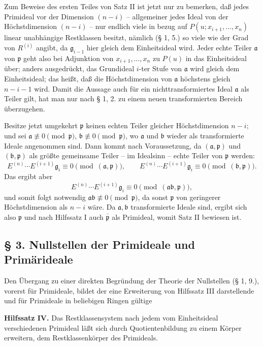 \documentclass[11pt]{article}
\providecommand{\frakp}{\mathfrak p}
\providecommand{\fraka}{\mathfrak a}
\providecommand{\frakb}{\mathfrak b}
\providecommand{\frakb}{\mathfrak b}
\providecommand{\frakg}{\mathfrak g}
\begin{document}
Zum Beweise des ersten Teiles von Satz II ist jetzt nur zu bemerken, daß jedes Primideal vor der Dimension $(n-i)$ -- allgemeiner jedes Ideal von der Höchstdimension $(n-i)$ -- nur endlich viele in bezug auf $P(u;x_{i+1},\ldots,x_n)$ linear unabhängige Restklassen besitzt, nämlich (§ 1, 5.) so viele wie der Grad von $R^{(i)}$ angibt, da $\frakg_{i-1}$ hier gleich dem Einheitsideal wird. Jeder echte Teiler $\fraka$ von $\frakp$ geht also bei Adjunktion von $x_{i+1},\ldots,x_n$ zu $P(u)$ in das Einheitsideal über; anders ausgedrückt, das Grundideal $i$-ter Stufe von $\fraka$ wird gleich dem Einheitsideal; das heißt, daß die Höchstdimension von $\fraka$ höchstens gleich $n-i-1$ wird. Damit die Aussage auch für ein nichttransformiertes Ideal $\fraka$ als Teiler gilt, hat man nur nach § 1, 2. zu einem neuen transformierten Bereich überzugehen.

Besitze jetzt umgekehrt $\frakp$ keinen echten Teiler gleicher Höchstdimension $n-i$; und sei $\fraka\not\equiv0\pmod{\frakp}$, $\frakb\not\equiv0\pmod{\frakp}$, wo $\fraka$ und $\frakb$ wieder als transformierte Ideale angenommen sind. Dann kommt nach Voraussetzung, da $(\fraka,\frakp)$ und $(\frakb,\frakp)$ als größte gemeinsame Teiler -- im Idealsinn -- echte Teiler von $\frakp$ werden:
\[
 E^{(n)}\cdots E^{(i+1)}\frakg_i\equiv0\pmod{(\fraka,\frakp)},
\qquad
 E^{(n)}\cdots E^{(i+1)}\frakg_i\equiv0\pmod{(\frakb,\frakp)}.
\]
Das ergibt aber
\[
 E^{(n)}\cdots E^{(i+1)}\frakg_i\equiv0\pmod{(\fraka\frakb,\frakp)},
\]
und somit folgt notwendig $\fraka\frakb\not\equiv0\pmod{\frakp}$, da sonst $\frakp$ von geringerer Höchstdimension als $n-i$ wäre. Da $\fraka,\frakb$ transformierte Ideale sind, ergibt sich also $\frakp$ und nach Hilfssatz I auch $\bar{\frakp}$ als Primideal, womit Satz II bewiesen ist.

\subsection*{§ 3. Nullstellen der Primideale und Primärideale}

Den Übergang zu einer direkten Begründung der Theorie der Nullstellen (§ 1, 9.), vorerst für Primideale, bildet der eine Erweiterung von Hilfssatz III darstellende und für Primideale in beliebigen Ringen gültige

\textbf{Hilfssatz IV.} Das Restklassensystem nach jedem vom Einheitsideal verschiedenen Primideal läßt sich durch Quotientenbildung zu einem Körper erweitern, dem Restklassenkörper des Primideals.
\end{document}
